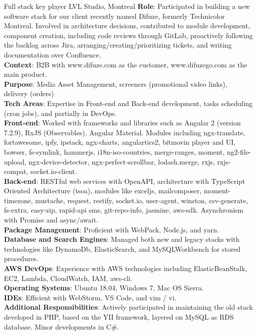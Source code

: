 \documentclass[
  a4paper,
   maincolor=cvblue,
   sectioncolor=cvblue,
]{fortysecondscv}
\begin{document}
\begin{cvtable}
    {Full stack key player}
    {LVL Studio, Montreal}
    {
      \textbf{Role}: Participated in building a new software stack for our client recently named Difuze, formerly Technicolor Montreal. Involved in architecture decisions, contributed to module development, component creation, including code reviews through GitLab, proactively following the backlog across Jira, arranging/creating/prioritizing tickets, and writing documentation over Confluence.\\
      \textbf{Context}: B2B with www.difuze.com as the customer, www.difuzego.com as the main product.\\
      \textbf{Purpose}: Media Asset Management, screeners (promotional video links), delivery (orders)\\
      \textbf{Tech Areas}: Expertise in Front-end and Back-end development, tasks scheduling (cron jobs), and partially in DevOps.\\
      \textbf{Front-end}: Worked with frameworks and libraries such as Angular 2 (version 7.2.9), RxJS (Observables), Angular Material. Modules including ngx-translate, fortawesome, ipfy, ipstack, ngx-charts, angulartics2, bitmovin player and UI, bowser, fs-symlink, hammerjs, i18n-iso-countries, merge-ranges, moment, ng2-file-upload, ngx-device-detector, ngx-perfect-scrollbar, lodash.merge, rxjs, rxjs-compat, socket.io-client.\\
      \textbf{Back-end}: RESTful web services with OpenAPI, architecture with TypeScript Oriented Architecture (tsoa), modules like exceljs, mailcomposer, moment-timezone, mustache, request, restify, socket.io, user-agent, winston, csv-generate, fs-extra, easy-zip, rapid-api sms, git-repo-info, jasmine, aws-sdk. Asynchronism with Promise and async/await.\\
      \textbf{Package Management}: Proficient with WebPack, Node.js, and yarn.\\
      \textbf{Database and Search Engines}: Managed both new and legacy stacks with technologies like DynamoDb, ElasticSearch, and MySQLWorkbench for stored procedures.\\
      \textbf{AWS DevOps}: Experience with AWS technologies including ElasticBeanStalk, EC2, Lambda, CloudWatch, IAM, aws-cli.\\
      \textbf{Operating Systems}: Ubuntu 18.04, Windows 7, Mac OS Sierra.\\
      \textbf{IDEs}: Efficient with WebStorm, VS Code, and vim / vi.\\
      \textbf{Additional Responsibilities}: Actively participated in maintaining the old stack developed in PHP, based on the YII framework, layered on MySQL as RDS database. Minor developments in C\#.
    }
\end{cvtable}
\end{document}
